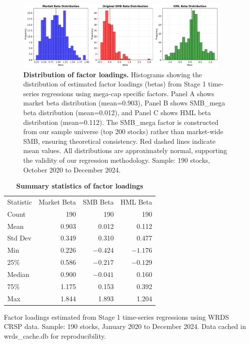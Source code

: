 \documentclass[10pt,letterpaper]{article}
\newlength\savedwidth
\newcommand\thickhline{\noalign{\global\savedwidth\arrayrulewidth\global\arrayrulewidth 2pt}%
\hline
\noalign{\global\arrayrulewidth\savedwidth}}
\begin{document}
\begin{figure}[!h]
\centering
\includegraphics[width=0.95\textwidth]{figures/fig1_beta_distributions.pdf}
\caption{\textbf{Distribution of factor loadings.}
Histograms showing the distribution of estimated factor loadings (betas) from Stage 1 time-series regressions using mega-cap specific factors. Panel A shows market beta distribution (mean=0.903), Panel B shows SMB\_mega beta distribution (mean=0.012), and Panel C shows HML beta distribution (mean=0.112). The SMB\_mega factor is constructed from our sample universe (top 200 stocks) rather than market-wide SMB, ensuring theoretical consistency. Red dashed lines indicate mean values. All distributions are approximately normal, supporting the validity of our regression methodology. Sample: 190 stocks, October 2020 to December 2024.}
\label{fig:beta_dist}
\end{figure}

\begin{table}[!htbp]
\centering
\caption{\textbf{Summary statistics of factor loadings}}
\begin{tabular}{lrrr}
\hline
Statistic & Market Beta & SMB Beta & HML Beta \\
\thickhline
Count & 190 & 190 & 190 \\
Mean & 0.903 & 0.012 & 0.112 \\
Std Dev & 0.349 & 0.310 & 0.477 \\
Min & 0.226 & $-0.424$ & $-1.176$ \\
25\% & 0.586 & $-0.217$ & $-0.129$ \\
Median & 0.900 & $-0.041$ & 0.160 \\
75\% & 1.175 & 0.153 & 0.392 \\
Max & 1.844 & 1.893 & 1.204 \\
\hline
\end{tabular}
\begin{flushleft}
Factor loadings estimated from Stage 1 time-series regressions using WRDS CRSP data. Sample: 190 stocks, January 2020 to December 2024. Data cached in wrds\_cache.db for reproducibility.
\end{flushleft}
\label{table:betas}
\end{table}
\end{document}
